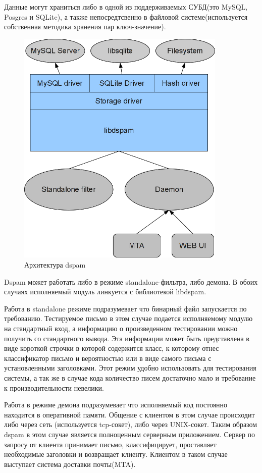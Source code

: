 Данные могут храниться либо в одной из поддерживаемых СУБД(это MySQL, Posgres и SQLite), а также непосредтсвенно в файловой системе(используется собственная методика хранения пар ключ-значение).

\begin{figure}[h]
\begin{center}
\includegraphics[width=10cm]{img/dspamarch}
\end{center}
\caption{Архитектура dspam}
\label{dspamarch}
\end{figure}

Dspam может работать либо в режиме standalone-фильтра, либо демона. В обоих случаях
исполняемый модуль линкуется с библиотекой libdspam.

Работа в standalone режиме подразумевает что бинарный файл запускается по требованию. Тестируемое письмо в этом случае подается исполняемому модулю на стандартный вход, а информацию о произведенном тестировании можно
получить со стандартного вывода. Эта информации может быть представлена в виде короткой строчки в которой содержится класс, к которому отнес классификатор письмо и вероятностью или в виде самого письма с установленными заголовками. Этот режим удобно использовать для тестирования системы, а так же в случае кода количество писем достаточно мало и требование к производительности невелики.

Работа в режиме демона подразумевает что исполняемый код постоянно находится в оперативной памяти. Общение с клиентом в этом случае происходит либо через сеть (используется tcp-сокет), либо через UNIX-сокет. Таким образом dspam в этом случае является полноценным серверным приложением. Сервер по запросу от клиента принимает письмо, классифицирует, проставляет необходимые заголовки и возвращает клиенту. Клиентом в таком случае выступает система доставки почты(MTA).

